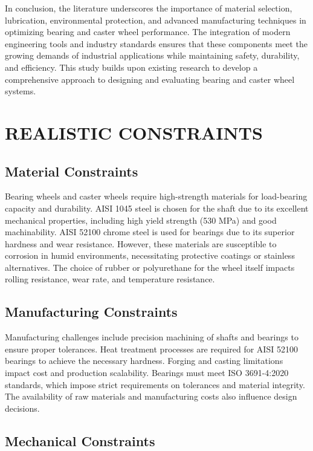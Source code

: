 \documentclass[../../main]{subfiles}
\begin{document}
In conclusion, the literature underscores the importance of material
selection, lubrication, environmental protection, and advanced
manufacturing techniques in optimizing bearing and caster wheel
performance. The integration of modern engineering tools and industry
standards ensures that these components meet the growing demands of
industrial applications while maintaining safety, durability, and
efficiency. This study builds upon existing research to develop a
comprehensive approach to designing and evaluating bearing and caster
wheel systems.

\newpage
\section{REALISTIC CONSTRAINTS}

\subsection{Material Constraints}

Bearing wheels and caster wheels require high-strength materials for
load-bearing capacity and durability. AISI 1045 steel is chosen for the
shaft due to its excellent mechanical properties, including high yield
strength (530 MPa) and good machinability. AISI 52100 chrome steel is
used for bearings due to its superior hardness and wear resistance.
However, these materials are susceptible to corrosion in humid
environments, necessitating protective coatings or stainless
alternatives. The choice of rubber or polyurethane for the wheel itself
impacts rolling resistance, wear rate, and temperature resistance.

\subsection{ Manufacturing Constraints}

Manufacturing challenges include precision machining of shafts and
bearings to ensure proper tolerances. Heat treatment processes are
required for AISI 52100 bearings to achieve the necessary hardness.
Forging and casting limitations impact cost and production scalability.
Bearings must meet ISO 3691-4:2020 standards, which impose strict
requirements on tolerances and material integrity. The availability of
raw materials and manufacturing costs also influence design decisions.

\subsection{Mechanical Constraints}
\end{document}
